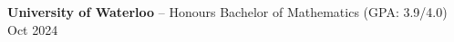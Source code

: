 \textbf{University of Waterloo} -- Honours Bachelor of Mathematics (GPA: 3.9/4.0) \hfill Oct 2024 \\
